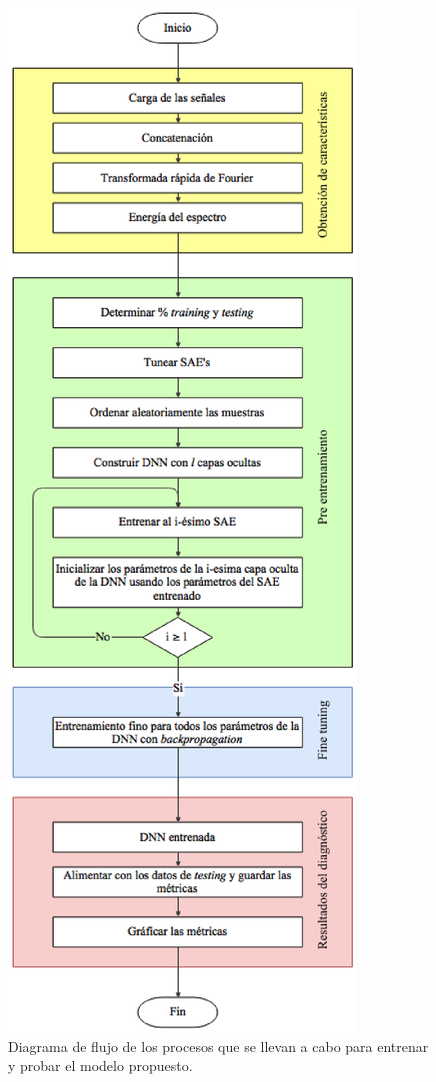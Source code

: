 \documentclass[12pt]{article}%
\begin{document}
\begin{figure}[ht]
  \centering
    \includegraphics[scale=0.6]{./block.eps}
  \caption{Diagrama de flujo de los procesos que se llevan a cabo para entrenar y probar el modelo propuesto.}
  \label{fig:block}
\end{figure}
\end{document}
